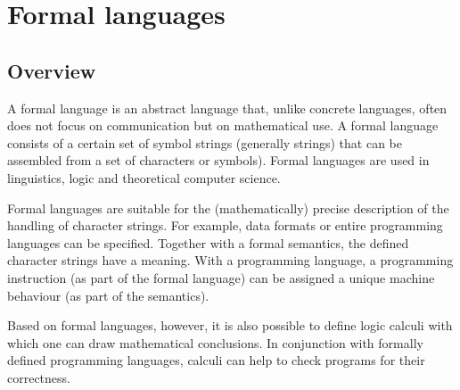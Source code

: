 \chapter{Formal languages}
\section{Overview}
A formal language is an abstract language that, unlike concrete languages, often does not focus on communication but on mathematical use. A formal language consists of a certain set of symbol strings (generally strings) that can be assembled from a set of characters or symbols). Formal languages are used in linguistics, logic and theoretical computer science.

Formal languages are suitable for the (mathematically) precise description of the handling of character strings. For example, data formats or entire programming languages can be specified. Together with a formal semantics, the defined character strings have a meaning. With a programming language, a programming instruction (as part of the formal language) can be assigned a unique machine behaviour (as part of the semantics).

Based on formal languages, however, it is also possible to define logic calculi with which one can draw mathematical conclusions. In conjunction with formally defined programming languages, calculi can help to check programs for their correctness.
